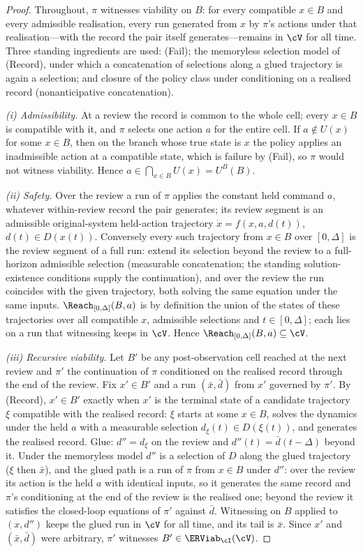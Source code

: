 \begin{proof}
Throughout, $\pi$ witnesses viability on $B$: for every compatible $x\in B$ and every admissible realisation, every run generated from $x$ by $\pi$'s actions under that realisation---with the record the pair itself generates---remains in $\cV$ for all time. Three standing ingredients are used: (Fail); the memoryless selection model of (Record), under which a concatenation of selections along a glued trajectory is again a selection; and closure of the policy class under conditioning on a realised record (nonanticipative concatenation).

\emph{(i) Admissibility.} At a review the record is common to the whole cell; every $x\in B$ is compatible with it, and $\pi$ selects one action $a$ for the entire cell. If $a\notin U(x)$ for some $x\in B$, then on the branch whose true state is $x$ the policy applies an inadmissible action at a compatible state, which is failure by (Fail), so $\pi$ would not witness viability. Hence $a\in\bigcap_{x\in B}U(x)=U^B(B)$.

\emph{(ii) Safety.} Over the review a run of $\pi$ applies the constant held command $a$, whatever within-review record the pair generates; its review segment is an admissible original-system held-action trajectory $\dot x=f(x,a,d(t))$, $d(t)\in D(x(t))$. Conversely every such trajectory from $x\in B$ over $[0,\Delta]$ is the review segment of a full run: extend its selection beyond the review to a full-horizon admissible selection (measurable concatenation; the standing solution-existence conditions supply the continuation), and over the review the run coincides with the given trajectory, both solving the same equation under the same inputs. $\Reach_{[0,\Delta]}(B,a)$ is by definition the union of the states of these trajectories over all compatible $x$, admissible selections and $t\in[0,\Delta]$; each lies on a run that witnessing keeps in $\cV$. Hence $\Reach_{[0,\Delta]}(B,a)\subseteq\cV$.

\emph{(iii) Recursive viability.} Let $B'$ be any post-observation cell reached at the next review and $\pi'$ the continuation of $\pi$ conditioned on the realised record through the end of the review. Fix $x'\in B'$ and a run $(\bar x,\bar d)$ from $x'$ governed by $\pi'$. By (Record), $x'\in B'$ exactly when $x'$ is the terminal state of a candidate trajectory $\xi$ compatible with the realised record: $\xi$ starts at some $x\in B$, solves the dynamics under the held $a$ with a measurable selection $d_\xi(t)\in D(\xi(t))$, and generates the realised record. Glue: $d''=d_\xi$ on the review and $d''(t)=\bar d(t-\Delta)$ beyond it. Under the memoryless model $d''$ is a selection of $D$ along the glued trajectory ($\xi$ then $\bar x$), and the glued path is a run of $\pi$ from $x\in B$ under $d''$: over the review its action is the held $a$ with identical inputs, so it generates the same record and $\pi$'s conditioning at the end of the review is the realised one; beyond the review it satisfies the closed-loop equations of $\pi'$ against $\bar d$. Witnessing on $B$ applied to $(x,d'')$ keeps the glued run in $\cV$ for all time, and its tail is $\bar x$. Since $x'$ and $(\bar x,\bar d)$ were arbitrary, $\pi'$ witnesses $B'\in\ERViab_\cI(\cV)$.


\end{proof}
